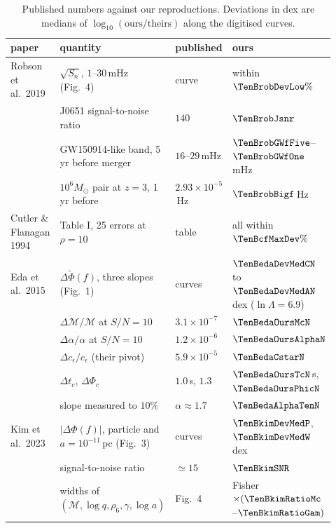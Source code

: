 \begin{table}[htbp]
\centering
\small
\renewcommand{\arraystretch}{1.15}
\begin{tabular}{@{}>{\raggedright\arraybackslash}p{0.15\linewidth}>{\raggedright\arraybackslash}p{0.37\linewidth}>{\raggedright\arraybackslash}p{0.16\linewidth}>{\raggedright\arraybackslash}p{0.24\linewidth}@{}}
\toprule
paper & quantity & published & ours\\\midrule
Robson et al.\ 2019 & $\sqrt{S_n}$, $1$--$30$\,mHz (Fig.~4) & curve & within $\TenBrobDevLow\%$\\
& J0651 signal-to-noise ratio & $140$ & $\TenBrobJsnr$\\
& GW150914-like band, 5\,yr before merger & $16$--$29$\,mHz & $\TenBrobGWfFive$--$\TenBrobGWfOne$\,mHz\\
& $10^6M_\odot$ pair at $z=3$, 1\,yr before & $2.93\times10^{-5}$\,Hz & $\TenBrobBigf$\,Hz\\
Cutler \& Flanagan 1994 & Table I, 25 errors at $\rho=10$ & table & all within $\TenBcfMaxDev\%$\\
Eda et al.\ 2015 & $\Delta\tilde\Phi(f)$, three slopes (Fig.~1) & curves & $\TenBedaDevMedCN$ to $\TenBedaDevMedAN$\,dex ($\ln\Lambda=6.9$)\\
& $\Delta\mathcal M/\mathcal M$ at $S/N=10$ & $3.1\times10^{-7}$ & $\TenBedaOursMcN$\\
& $\Delta\alpha/\alpha$ at $S/N=10$ & $1.2\times10^{-6}$ & $\TenBedaOursAlphaN$\\
& $\Delta c_\epsilon/c_\epsilon$ (their pivot) & $5.9\times10^{-5}$ & $\TenBedaCstarN$\\
& $\Delta t_c$, $\Delta\Phi_c$ & $1.0$\,s, $1.3$ & $\TenBedaOursTcN$\,s, $\TenBedaOursPhicN$\\
& slope measured to $10\%$ & $\alpha\approx1.7$ & $\TenBedaAlphaTenN$\\
Kim et al.\ 2023 & $|\Delta\Phi(f)|$, particle and $a=10^{-11}$\,pc (Fig.~3) & curves & $\TenBkimDevMedP$, $\TenBkimDevMedW$\,dex\\
& signal-to-noise ratio & $\simeq15$ & $\TenBkimSNR$\\
& widths of $(\mathcal M,\log q,\rho_6,\gamma,\log a)$ & Fig.~4 & Fisher $\times(\TenBkimRatioMc$--$\TenBkimRatioGam)$\\
\bottomrule
\end{tabular}
\caption{Published numbers against our reproductions. Deviations in dex are medians of $\log_{10}(\text{ours}/\text{theirs})$
along the digitised curves.}
\label{10b:tab:paper-vs-ours}
\end{table}
